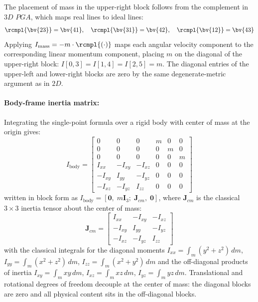 The placement of mass in the upper-right block follows from the complement in $3D$ $PGA$,
which maps real lines to ideal lines:
\begin{equation}
    \rcmpl{\bv{23}} = \bv{41}, \quad \rcmpl{\bv{31}} = \bv{42}, \quad
    \rcmpl{\bv{12}} = \bv{43}
    \label{eq:dual_pga3dp}
\end{equation}
Applying $I_\mathrm{mass} = -m \cdot \rcmpl{(\cdot)}$ maps each angular velocity component
to the corresponding linear momentum component, placing $m$ on the diagonal of the
upper-right block: $I[0,3] = I[1,4] = I[2,5] = m$. The diagonal entries of the upper-left
and lower-right blocks are zero by the same degenerate-metric argument as in $2D$.

\paragraph{Body-frame inertia matrix:} Integrating the single-point formula over a rigid
body
with center of mass at the origin gives:
\begin{equation}
    I_\mathrm{body} =
    \begin{bmatrix}
        0       & 0       & 0       &  m   & 0    & 0    \\
        0       & 0       & 0       &  0   & m    & 0    \\
        0       & 0       & 0       &  0   & 0    & m    \\
        I_{xx}  & -I_{xy} & -I_{xz} &  0   & 0    & 0    \\
        -I_{xy} &  I_{yy} & -I_{yz} &  0   & 0    & 0    \\
        -I_{xz} & -I_{yz} &  I_{zz} &  0   & 0    & 0
    \end{bmatrix}
    \label{eq:inertia_3D_body}
\end{equation}
written in block form as $I_\mathrm{body} = [\mathbf{0},\; m\mathbf{I}_3;\;
\mathbf{J}_{cm},\; \mathbf{0}]$, where $\mathbf{J}_{cm}$ is the classical $3\times3$
inertia tensor about the center of mass:
\begin{equation}
    \mathbf{J}_{cm} =
    \begin{bmatrix}
        I_{xx}  & -I_{xy} & -I_{xz} \\
        -I_{xy} &  I_{yy} & -I_{yz} \\
        -I_{xz} & -I_{yz} &  I_{zz}
    \end{bmatrix}
    \label{eq:classical_inertia_tensor}
\end{equation}
with the classical integrals for the diagonal moments $I_{xx} = \int_m (y^2+z^2)\,dm$,
$I_{yy} = \int_m (x^2+z^2)\,dm$, $I_{zz} = \int_m (x^2+y^2)\,dm$ and the off-diagonal
products of inertia $I_{xy} = \int_m xy\,dm$, $I_{xz} = \int_m xz\,dm$, $I_{yz} = \int_m
yz\,dm$. Translational and rotational degrees of freedom decouple at the center of mass:
the diagonal blocks are zero and all physical content sits in the off-diagonal blocks.

